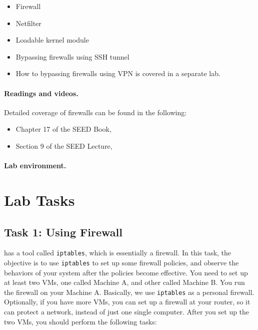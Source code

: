 \begin{itemize}[noitemsep]
\item Firewall
\item Netfilter
\item Loadable kernel module
\item Bypassing firewalls using SSH tunnel 
\item How to bypassing firewalls using VPN is covered in a separate lab.
\end{itemize}


\paragraph{Readings and videos.}
Detailed coverage of firewalls can be found in the following:

\begin{itemize}
\item Chapter 17 of the SEED Book, \seedbook
\item Section 9 of the SEED Lecture, \seedisvideo
\end{itemize}


\paragraph{Lab environment.} \seedenvironmentB



\section{Lab Tasks}



\subsection{Task 1: Using Firewall}

\linux has a tool called {\tt iptables}, which is essentially a firewall.
In this task, the objective is to use {\tt iptables} to set up some firewall policies, and 
observe the behaviors of your system after the policies become effective.
You need to set up at least two VMs, one called Machine A, and other called 
Machine B. You run the firewall on your Machine A. Basically, we use 
{\tt iptables} as a personal firewall. Optionally, if you have more VMs, you can 
set up a firewall at your router, so it can protect a network, instead of 
just one single computer. After you set up the two VMs, you should perform
the following tasks: 

